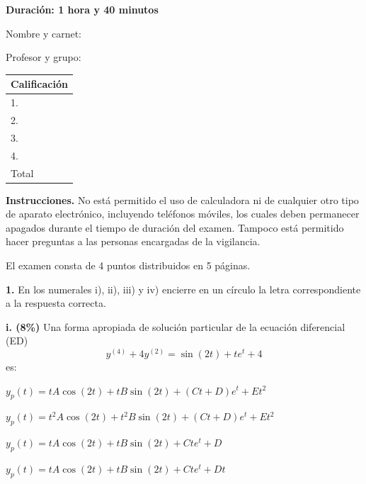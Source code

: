 \documentclass[11pt]{article}
\begin{document}
\examheader

\vspace{4pt}
\noindent
\begin{minipage}[t]{0.62\linewidth}
\textbf{Duración: 1 hora y 40 minutos}

\vspace{8pt}
Nombre y carnet: \dotfill

\vspace{6pt}
Profesor y grupo: \dotfill
\end{minipage}%
\hfill
\begin{minipage}[t]{0.32\linewidth}
\begin{tabular}{|l|c|}
\hline
\multicolumn{2}{|c|}{\textbf{Calificación}} \\ \hline
1. & \\ \hline
2. & \\ \hline
3. & \\ \hline
4. & \\ \hline
Total & \\ \hline
\end{tabular}
\end{minipage}

\vspace{8pt}
\noindent\textbf{Instrucciones.} No está permitido el uso de calculadora ni de cualquier otro tipo de aparato electrónico, incluyendo teléfonos móviles, los cuales deben permanecer apagados durante el tiempo de duración del examen. Tampoco está permitido hacer preguntas a las personas encargadas de la vigilancia.

\vspace{4pt}
\noindent El examen consta de 4 puntos distribuidos en 5 páginas.

\vspace{6pt}
\noindent\textbf{1.} En los numerales i), ii), iii) y iv) encierre en un círculo la letra correspondiente a la respuesta correcta.

\vspace{0.25cm}
\noindent\textbf{i. (8\%)} Una forma apropiada de solución particular de la ecuación diferencial (ED)
\[
y^{(4)}+4y^{(2)}=\sin(2t)+te^t+4
\]
es:
\begin{opciones}
\item $y_p(t)=tA\cos(2t)+tB\sin(2t)+(Ct+D)e^t+Et^2$
\item $y_p(t)=t^2A\cos(2t)+t^2B\sin(2t)+(Ct+D)e^t+Et^2$
\item $y_p(t)=tA\cos(2t)+tB\sin(2t)+Cte^t+D$
\item $y_p(t)=tA\cos(2t)+tB\sin(2t)+Cte^t+Dt$
\end{opciones}
\end{document}
